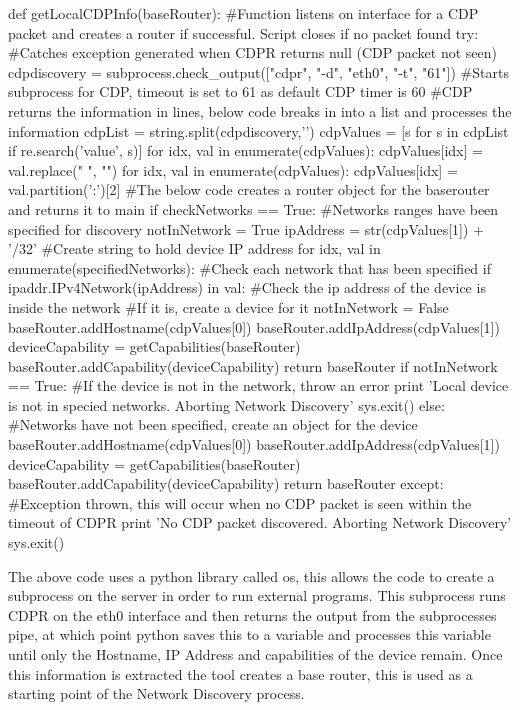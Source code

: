\documentclass[11pt]{report}
\begin{document}
\begin{python}
def getLocalCDPInfo(baseRouter):
	#Function listens on interface for a CDP packet and creates a router if successful. Script closes if no packet found
	try: #Catches exception generated when CDPR returns null (CDP packet not seen)
		cdpdiscovery = subprocess.check_output(["cdpr", "-d", "eth0", "-t", "61"])
		#Starts subprocess for CDP, timeout is set to 61 as default CDP timer is 60
		#CDP returns the information in lines, below code breaks in into a list and processes the information 
		cdpList = string.split(cdpdiscovery,'\n')
		cdpValues = [s for s in cdpList if re.search('value', s)]
		for idx, val in enumerate(cdpValues):
			cdpValues[idx] = val.replace(" ", "")
		for idx, val in enumerate(cdpValues):
			cdpValues[idx] = val.partition(':')[2]
		#The below code creates a router object for the baserouter and returns it to main
		if checkNetworks == True:
			#Networks ranges have been specified for discovery
			notInNetwork = True
			ipAddress = str(cdpValues[1]) + '/32'
			#Create string to hold device IP address
			for idx, val in enumerate(specifiedNetworks):
				#Check each network that has been specified
				if ipaddr.IPv4Network(ipAddress) in val:
					#Check the ip address of the device is inside the network
					#If it is, create a device for it
					notInNetwork = False
					baseRouter.addHostname(cdpValues[0])
					baseRouter.addIpAddress(cdpValues[1])
					deviceCapability = getCapabilities(baseRouter)
					baseRouter.addCapability(deviceCapability)
					return baseRouter
			if notInNetwork == True:
				#If the device is not in the network, throw an error
				print 'Local device is not in specied networks. Aborting Network Discovery'
				sys.exit()
		else:
		#Networks have not been specified, create an object for the device
		baseRouter.addHostname(cdpValues[0])
		baseRouter.addIpAddress(cdpValues[1])
		deviceCapability = getCapabilities(baseRouter)
		baseRouter.addCapability(deviceCapability)
		return baseRouter
	except:
		#Exception thrown, this will occur when no CDP packet is seen within the timeout of CDPR
		print 'No CDP packet discovered. Aborting Network Discovery'
		sys.exit()
\end{python}

The above code uses a python library called os, this allows the code to create a subprocess on the server in order to run external programs. This subprocess runs CDPR on the eth0 interface and then returns the output from the subprocesses pipe, at which point python saves this to a variable and processes this variable until only the Hostname, IP Address and capabilities of the device remain. Once this information is extracted the tool creates a base router, this is used as a starting point of the Network Discovery process.
\end{document}
